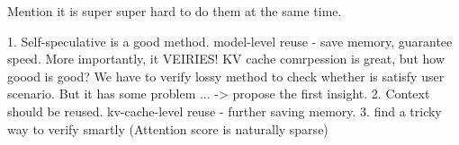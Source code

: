 Mention it is super super hard to do them at the same time.


1. Self-speculative is a good method. model-level reuse - save memory, guarantee speed. More importantly, it VEIRIES! KV cache comrpession is great, but how goood is good? We have to verify lossy method to check whether is satisfy user scenario. But it has some problem ... -> propose the first insight.
2. Context should be reused. kv-cache-level reuse - further saving memory.
3. find a tricky way to verify smartly (Attention score is naturally sparse)
